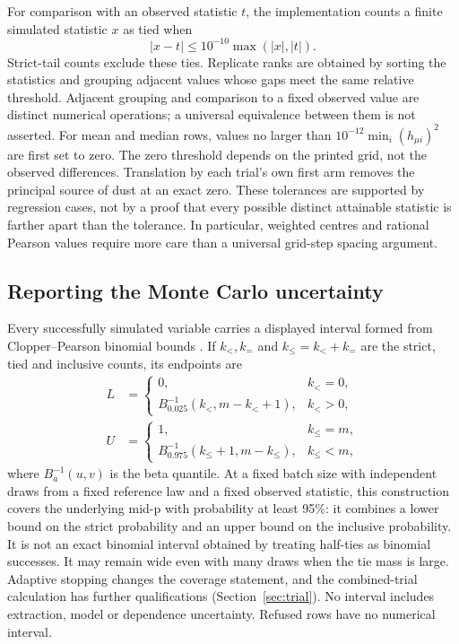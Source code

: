 \documentclass[11pt,a4paper]{article}
\begin{document}
For comparison with an observed statistic $t$, the implementation counts a finite simulated statistic $x$ as tied when
\begin{equation}
|x-t| \le 10^{-10}\max(|x|,|t|).
\end{equation}
Strict-tail counts exclude these ties. Replicate ranks are obtained by sorting the statistics and grouping adjacent values whose gaps meet the same relative threshold. Adjacent grouping and comparison to a fixed observed value are distinct numerical operations; a universal equivalence between them is not asserted. For mean and median rows, values no larger than $10^{-12}\min_i(h_{\mu i})^2$ are first set to zero. The zero threshold depends on the printed grid, not the observed differences. Translation by each trial's own first arm removes the principal source of dust at an exact zero. These tolerances are supported by regression cases, not by a proof that every possible distinct attainable statistic is farther apart than the tolerance. In particular, weighted centres and rational Pearson values require more care than a universal grid-step spacing argument.

\subsection{Reporting the Monte Carlo uncertainty}
\label{sec:reporting}

Every successfully simulated variable carries a displayed interval formed from Clopper--Pearson binomial bounds \citep{clopper1934}. If $k_<,k_=$ and $k_\le=k_<+k_=$ are the strict, tied and inclusive counts, its endpoints are
\begin{align}
L &= \begin{cases}0,&k_{<}=0,\\ B^{-1}_{0.025}(k_<,m-k_<+1),&k_{<}>0,\end{cases}\\
U &= \begin{cases}1,&k_\le=m,\\ B^{-1}_{0.975}(k_\le+1,m-k_\le),&k_\le<m,\end{cases}
\end{align}
where $B^{-1}_{a}(u,v)$ is the beta quantile. At a fixed batch size with independent draws from a fixed reference law and a fixed observed statistic, this construction covers the underlying mid-p with probability at least 95\%: it combines a lower bound on the strict probability and an upper bound on the inclusive probability. It is not an exact binomial interval obtained by treating half-ties as binomial successes. It may remain wide even with many draws when the tie mass is large. Adaptive stopping changes the coverage statement, and the combined-trial calculation has further qualifications (Section~\ref{sec:trial}). No interval includes extraction, model or dependence uncertainty. Refused rows have no numerical interval.
\end{document}
